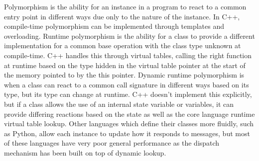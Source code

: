 \documentclass[a4paper,12pt]{book}
\begin{document}
Polymorphism is the ability for an instance in a program to react to a common entry point in different ways due only to the nature of the instance.
In C++, compile-time polymorphism can be implemented through templates and overloading.
Runtime polymorphism is the ability for a class to provide a different implementation for a common base operation with the class type unknown at compile-time.
C++ handles this through virtual tables, calling the right function at runtime based on the type hidden in the virtual table pointer at the start of the memory pointed to by the this pointer.
Dynamic runtime polymorphism is when a class can react to a common call signature in different ways based on its type, but its type can change at runtime.
C++ doesn't implement this explicitly, but if a class allows the use of an internal state variable or variables, it can provide differing reactions based on the state as well as the core language runtime virtual table lookup.
Other languages which define their classes more fluidly, such as Python, allow each instance to update how it responds to messages, but most of these languages have very poor general performance as the dispatch mechanism has been built on top of dynamic lookup.
\end{document}
